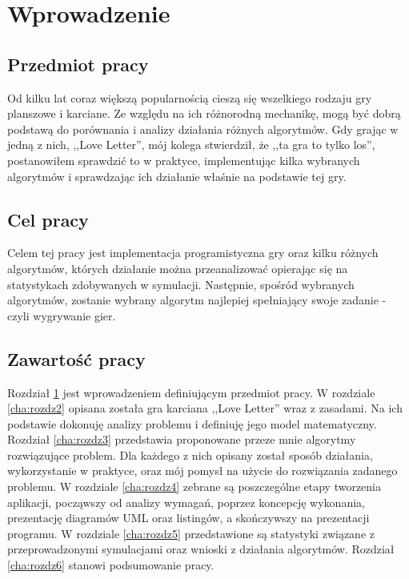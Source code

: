 \chapter{Wprowadzenie}
\label{cha:rozdz1}
\section{Przedmiot pracy}
\label{sec:przedmiotPracy}

Od kilku lat coraz większą popularnością cieszą się wszelkiego rodzaju gry planszowe i karciane. Ze względu na ich różnorodną mechanikę, mogą być dobrą podstawą do porównania i analizy działania różnych algorytmów. Gdy grając w jedną z nich, ,,Love Letter'', mój kolega stwierdził, że ,,ta gra to tylko los'', postanowiłem sprawdzić to w praktyce, implementując kilka wybranych algorytmów i sprawdzając ich działanie właśnie na podstawie tej gry.

\section{Cel pracy}
\label{sec:zawartoscPracy}
Celem tej pracy jest implementacja programistyczna gry oraz kilku różnych algorytmów, których działanie można przeanalizować opierając się na statystykach zdobywanych w symulacji. Następnie, spośród wybranych algorytmów, zostanie wybrany algorytm najlepiej spełniający swoje zadanie - czyli wygrywanie gier.

\section{Zawartość pracy}
\label{sec:zawartoscPracy}
Rozdział \ref{cha:rozdz1} jest wprowadzeniem definiującym przedmiot pracy. W rozdziale \ref{cha:rozdz2} opisana została gra karciana ,,Love Letter'' wraz z zasadami. Na ich podstawie dokonuję analizy problemu i definiuję jego model matematyczny. Rozdział \ref{cha:rozdz3} przedstawia proponowane przeze mnie algorytmy rozwiązujące problem. Dla każdego z nich opisany został sposób działania, wykorzystanie w praktyce, oraz mój pomysł na użycie do rozwiązania zadanego problemu. W rozdziale \ref{cha:rozdz4} zebrane są poszczególne etapy tworzenia aplikacji, począwszy od analizy wymagań, poprzez koncepcję wykonania, prezentację diagramów UML oraz listingów, a skończywszy na prezentacji programu. W rozdziale \ref{cha:rozdz5} przedstawione są statystyki związane z przeprowadzonymi symulacjami oraz wnioski z działania algorytmów. Rozdział \ref{cha:rozdz6} stanowi podsumowanie pracy.